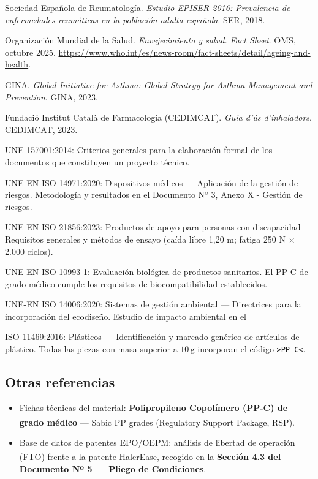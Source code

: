 \documentclass[11pt,a4paper]{article}
\begin{document}
\begin{enumerate}[label={[\arabic*]}]
    \item Sociedad Española de Reumatología. \textit{Estudio EPISER 2016: Prevalencia de enfermedades reumáticas en la población adulta española}. SER, 2018.
    \item Organización Mundial de la Salud. \textit{Envejecimiento y salud. Fact Sheet}. OMS, octubre 2025. \url{https://www.who.int/es/news-room/fact-sheets/detail/ageing-and-health}.
    \item GINA. \textit{Global Initiative for Asthma: Global Strategy for Asthma Management and Prevention}. GINA, 2023.
    \item Fundació Institut Català de Farmacologia (CEDIMCAT). \textit{Guia d'ús d'inhaladors}. CEDIMCAT, 2023.
    \item UNE 157001:2014: Criterios generales para la elaboración formal de los documentos que constituyen un proyecto técnico.
    \item UNE-EN ISO 14971:2020: Dispositivos médicos — Aplicación de la gestión de riesgos. Metodología y resultados en el Documento Nº 3, Anexo X - Gestión de riesgos.
    \item UNE-EN ISO 21856:2023: Productos de apoyo para personas con discapacidad — Requisitos generales y métodos de ensayo (caída libre 1{,}20 m; fatiga 250 N × 2.000 ciclos).
    \item UNE-EN ISO 10993-1: Evaluación biológica de productos sanitarios. El PP-C de grado médico cumple los requisitos de biocompatibilidad establecidos.
    \item UNE-EN ISO 14006:2020: Sistemas de gestión ambiental — Directrices para la incorporación del ecodiseño. Estudio de impacto ambiental en el 
    \item ISO 11469:2016: Plásticos — Identificación y marcado genérico de artículos de plástico. Todas las piezas con masa superior a $10\,\text{g}$ incorporan el código \texttt{>PP-C<}.

\end{enumerate}

\subsection{Otras referencias}

\begin{itemize}
    \item Fichas técnicas del material: \textbf{Polipropileno Copolímero (PP-C) de grado médico} — Sabic\textsuperscript{\textregistered} PP grades (Regulatory Support Package, RSP).
    \item Base de datos de patentes EPO/OEPM: análisis de libertad de operación (FTO) frente a la patente HalerEase\textsuperscript{\textregistered}, recogido en la \textbf{Sección 4.3 del Documento Nº 5 — Pliego de Condiciones}.
\end{itemize}
\end{document}
